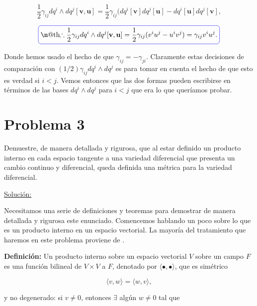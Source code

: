 \documentclass[a4paper,10pt]{article}
\makeatletter
\numberwithin{equation}{section}
\newcommand*{\boxcolor}{blue}
\renewcommand{\boxed}[1]{\textcolor{\boxcolor}{%
\tikz[baseline={([yshift=-1ex]current bounding box.center)}] \node [rectangle, minimum width=1ex,rounded corners,draw] {\normalcolor\m@th$\displaystyle#1$};}}
\newcommand{\definicion}{\textbf{Definición: }}
\makeatother
\begin{document}
\begin{equation}
 \frac{1}{2}\gamma_{ij} dq^i \wedge dq^j [\mathbf{v},\mathbf{u}] = 
 \frac{1}{2}\gamma_{ij}(dq^i[\mathbf{v}]dq^j[\mathbf{u}] - dq^i[\mathbf{u}]dq^j[\mathbf{v}],
\end{equation}

\begin{equation}
 \boxed{\therefore \frac{1}{2}\gamma_{ij} dq^i \wedge dq^j [\mathbf{v},\mathbf{u}] = 
 \frac{1}{2}\gamma_{ij}(v^iu^j - u^iv^j) = \gamma_{ij}v^iu^j.}
\end{equation}

Donde hemos usado el hecho de que $\gamma_{ij} = - \gamma_{ji}$. Claramente estas decisiones 
de comparación con $(1/2)\gamma_{ij}dq^i \wedge dq^j$ es para tomar en cuenta el hecho 
de que esto es verdad si $i < j$. Vemos entonces que las dos formas pueden escribirse 
en términos de las bases $dq^i \wedge dq^j$ para $i < j$ que era lo que queríamos probar.


\section{Problema 3}

Demuestre, de manera detallada y rigurosa, que al estar definido un producto interno 
en cada espacio tangente a una variedad diferencial que presenta un cambio continuo 
y diferencial, queda definida una métrica para la variedad diferencial.

\vspace{.3cm}

\underline{Solución:} \vspace{.3cm}

Necesitamos una serie de definiciones y teoremas para demostrar de manera detallada 
y rigurosa este enunciado. Comencemos hablando un poco sobre lo que es un producto 
interno en un espacio vectorial. La mayoría del tratamiento que haremos en este 
problema proviene de \cite{spivak}.

\vspace{.3cm}

\definicion Un producto interno sobre un espacio vectorial $V$ sobre un campo $F$ es 
una función bilineal de $V \times V$ a $F$, denotado por $\langle \bullet, \bullet \rangle$, que 
es simétrico

\begin{equation}
 \langle v, w \rangle = \langle w, v \rangle,
\end{equation}

y no degenerado: si $v\ne 0$, entonces $\exists$ algún $w \ne 0$ tal que
\end{document}

